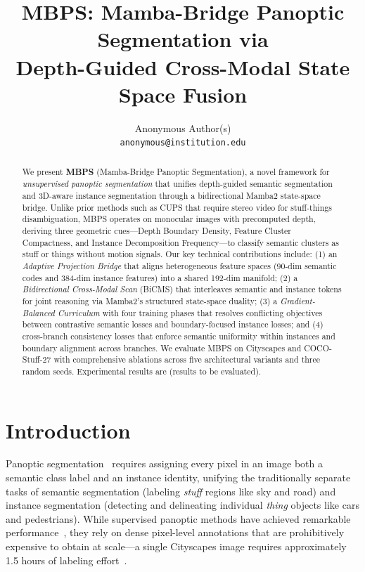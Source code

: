\documentclass{article}
\title{MBPS: Mamba-Bridge Panoptic Segmentation via\\Depth-Guided Cross-Modal State Space Fusion}
\author{%
  Anonymous Author(s)\\
  \texttt{anonymous@institution.edu}
}
\begin{document}
\maketitle

\begin{abstract}
We present \textbf{MBPS} (Mamba-Bridge Panoptic Segmentation), a novel framework for \emph{unsupervised panoptic segmentation} that unifies depth-guided semantic segmentation and 3D-aware instance segmentation through a bidirectional Mamba2 state-space bridge.
Unlike prior methods such as CUPS that require stereo video for stuff-things disambiguation, MBPS operates on monocular images with precomputed depth, deriving three geometric cues---Depth Boundary Density, Feature Cluster Compactness, and Instance Decomposition Frequency---to classify semantic clusters as stuff or things without motion signals.
Our key technical contributions include: (1) an \emph{Adaptive Projection Bridge} that aligns heterogeneous feature spaces (90-dim semantic codes and 384-dim instance features) into a shared 192-dim manifold; (2) a \emph{Bidirectional Cross-Modal Scan} (BiCMS) that interleaves semantic and instance tokens for joint reasoning via Mamba2's structured state-space duality; (3) a \emph{Gradient-Balanced Curriculum} with four training phases that resolves conflicting objectives between contrastive semantic losses and boundary-focused instance losses; and (4) cross-branch consistency losses that enforce semantic uniformity within instances and boundary alignment across branches.
We evaluate MBPS on Cityscapes and COCO-Stuff-27 with comprehensive ablations across five architectural variants and three random seeds.
Experimental results are \underline{\hspace{2em}} (results to be evaluated).
\end{abstract}


\section{Introduction}
\label{sec:intro}

Panoptic segmentation~\cite{kirillov2019panoptic} requires assigning every pixel in an image both a semantic class label and an instance identity, unifying the traditionally separate tasks of semantic segmentation (labeling \emph{stuff} regions like sky and road) and instance segmentation (detecting and delineating individual \emph{thing} objects like cars and pedestrians). While supervised panoptic methods have achieved remarkable performance~\cite{cheng2022mask2former}, they rely on dense pixel-level annotations that are prohibitively expensive to obtain at scale---a single Cityscapes image requires approximately 1.5 hours of labeling effort~\cite{cordts2016cityscapes}.
\end{document}

